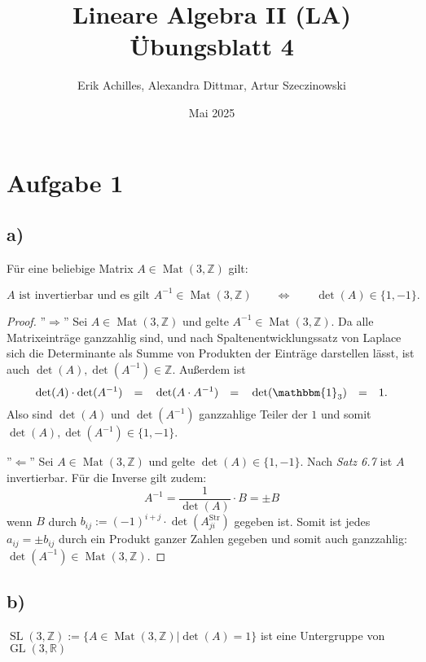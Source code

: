\documentclass{article}
\title{Lineare Algebra II (LA) Übungsblatt 4}
\author{Erik Achilles, Alexandra Dittmar, Artur Szeczinowski}
\date{Mai 2025}
\newcommand{\ZZ}{\mathbb{Z}}
\newcommand{\RR}{\mathbb{R}}
\newcommand{\equ}{\mathbb{\Leftrightarrow}}
\newcommand{\eq}{\mathbb{\quad = \quad}}
\DeclareMathOperator{\Mat}{Mat}
\DeclareMathOperator{\GL}{GL}
\DeclareMathOperator{\SL}{SL}
\begin{document}
\section*{Aufgabe 1}

\subsection*{a)}
Für eine beliebige Matrix
$A \in \Mat(3,\ZZ)$
gilt:

\[
  \text{$A$ ist invertierbar und es gilt $A^{-1} \in \Mat(3,\ZZ)$}
  \qquad\equ\qquad
  \det(A) \in \{1,-1\}.
\]
\begin{proof}
  ''$\Rightarrow$''
  Sei $A \in \Mat(3,\ZZ)$
  und gelte
  $A^{-1} \in \Mat(3,\ZZ)$.
  Da alle Matrixeinträge
  ganzzahlig sind, und
  nach Spaltenentwicklungssatz von Laplace
  sich die Determinante als Summe von
  Produkten der Einträge darstellen lässt, ist auch
  $\det(A), \det(A^{-1}) \in \ZZ$.
  Außerdem ist
  \[
    \det(A) \cdot \det(A^{-1})
    \eq
    \det(A \cdot A^{-1})
    \eq
    \det(\mathbbm{1}_3)
    \eq
    1.
  \]
  Also sind
  $\det(A)$ und $\det(A^{-1})$
  ganzzahlige Teiler der $1$ und somit
  $\det(A), \det(A^{-1}) \in \{1,-1\}$.

  \bigbreak

  ''$\Leftarrow$''
  Sei $A \in \Mat(3,\ZZ)$
  und gelte
  $\det(A) \in \{1,-1\}$.
  Nach \textit{Satz 6.7}
  ist $A$ invertierbar.
  Für die Inverse gilt zudem:
  \[
    A^{-1} = \frac{1}{\det(A)} \cdot B = \pm B
  \]
  wenn $B$ durch
  $b_{ij} := (-1)^{i+j} \cdot \det(A_{ji}^{\text{Str}})$
  gegeben ist. Somit ist jedes $a_{ij} = \pm b_{ij}$ durch ein Produkt
  ganzer Zahlen gegeben und somit auch ganzzahlig:
  $\det(A^{-1}) \in \Mat(3,\ZZ)$.
\end{proof}

\subsection*{b)}

$\SL(3,\ZZ) := \{A \in \Mat(3,\ZZ) | \det(A) = 1\}$
ist eine Untergruppe von
$\GL(3,\RR)$
\end{document}
